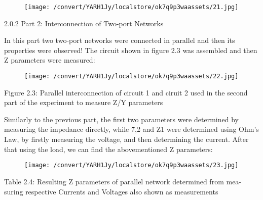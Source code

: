 \documentclass[12pt]{report}
\begin{document}
\begin{figure}[h]

\texttt{[image: /convert/YARH1Jy/localstore/ok7q9p3waassets/21.jpg]}

\centering

\end{figure}

\par

\vspace{10pt}

    2.0.2 Part 2: Interconnection of Two-port Networks 

\vspace{10pt}

    In this part two two-port networks were connected in parallel and then its  properties were observed! The circuit shown in figure 2.3 was assembled and  then Z parameters were measured: 

\vspace{10pt}

\begin{figure}[h]

\texttt{[image: /convert/YARH1Jy/localstore/ok7q9p3waassets/22.jpg]}

\centering

\end{figure}

    Figure 2.3: Parallel interconnection of circuit 1 and ciruit 2 used in the second  part of the experiment to measure Z/Y parameters 

\vspace{10pt}

    Similarly to the previous part, the first two parameters were determined  by measuring the impedance directly, while 7,2 and Z1 were determined  using Ohm’s Law, by firstly measuring the voltage, and then determining  the current. After that using the load, we can find the abovementioned Z  parameters: 

\vspace{10pt}

\begin{figure}[h]

\texttt{[image: /convert/YARH1Jy/localstore/ok7q9p3waassets/23.jpg]}

\centering

\end{figure}

    Table 2.4: Resulting Z parameters of parallel network determined from mea-  suring respective Currents and Voltages also shown as measurements 
\end{document}
